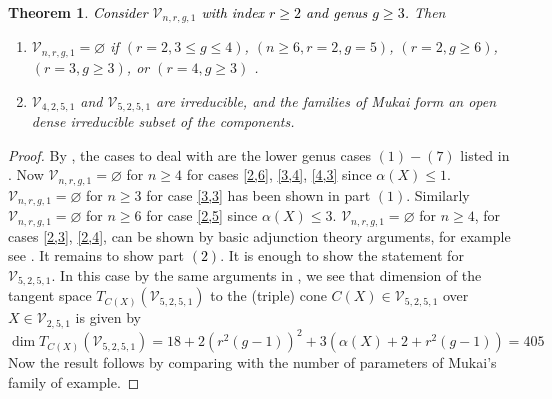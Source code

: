 \documentclass[11pt,twoside]{amsart}
\theoremstyle{plain}
\numberwithin{equation}{section}
\newtheorem{theorem}{Theorem}[section]
\theoremstyle{definition}
\begin{document}
\color{black}

\begin{theorem}\label{classification of Mukai varieties with index two}
\textcolor{black}{Consider} $\mathcal{V}_{n,r,g,1}$ \textcolor{black}{with index $r \geq 2$ and genus $g \geq 3$.} Then 
\begin{enumerate}
    \item $\mathcal{V}_{n,r,g,1} = \varnothing$ if $(r = 2, 3 \leq g \leq 4)$, $(n \geq 6, r = 2, g = 5)$, $(r = 2, g \geq 6)$, $(r = 3, g \geq 3)$, or $(r = 4, g \geq 3)$ . 
    \item $\mathcal{V}_{4,2,5,1}$ and $\mathcal{V}_{5,2,5,1}$ are irreducible, and the families of Mukai form an open dense irreducible subset of the components.
\end{enumerate}
\end{theorem}

\begin{proof}
   By , the cases to deal with are the lower genus cases $(1)-(7)$  listed in \textcolor{black}{}. Now $\mathcal{V}_{n,r,g,1} = \varnothing$ for $n \geq 4$ for cases \ref{2,6}, \ref{3,4}, \ref{4,3} since $\alpha(X) \leq 1$. $\mathcal{V}_{n,r,g,1} = \varnothing$ for $n \geq 3$ for case \ref{3,3} has been shown in  part $(1)$. Similarly $\mathcal{V}_{n,r,g,1} = \varnothing$ for $n \geq 6$ for case \ref{2,5} since $\alpha(X) \leq 3$.  $\mathcal{V}_{n,r,g,1} = \varnothing$ for $n \geq 4$, for cases \ref{2,3}, \ref{2,4}, can be shown by basic adjunction theory arguments, for example see \cite[\textcolor{black}{Theorem $3.15$}]{CLM98}. It remains to show part \textcolor{black}{$(2)$}. It is enough to show the statement for $\mathcal{V}_{5,2,5,1}$. In this case by the same arguments in , we see that dimension of the tangent space $T_{C(X)}(\mathcal{V}_{5,2,5,1})$ to the (triple) cone $C(X) \in \mathcal{V}_{5,2,5,1}$ over $X \in \mathcal{V}_{2,5,1}$ is given by 
   $$\operatorname{dim}T_{C(X)}(\mathcal{V}_{5,2,5,1}) = 18+2(r^2(g-1))^2+3(\alpha(X)+2+r^2(g-1)) = 405$$
   Now the result follows by comparing with the number of parameters of Mukai's family of example.


\end{proof}
\end{document}
